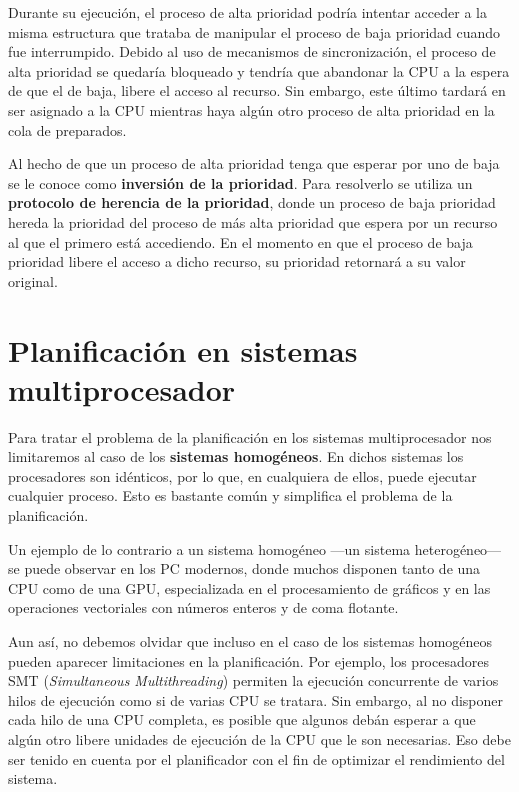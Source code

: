 Durante su ejecución, el proceso de alta prioridad podría intentar
acceder a la misma estructura que trataba de manipular el proceso de
baja prioridad cuando fue interrumpido. Debido al uso de mecanismos de
sincronización, el proceso de alta prioridad se quedaría bloqueado y
tendría que abandonar la CPU a la espera de que el de baja, libere el
acceso al recurso. Sin embargo, este último tardará en ser asignado a la
CPU mientras haya algún otro proceso de alta prioridad en la cola de
preparados.

Al hecho de que un proceso de alta prioridad tenga que esperar por uno
de baja se le conoce como \textbf{{}inversión de la prioridad}. Para
resolverlo se utiliza un \textbf{{}protocolo de herencia de la
prioridad}, donde un proceso de baja prioridad hereda la prioridad del
proceso de más alta prioridad que espera por un recurso al que el
primero está accediendo. En el momento en que el proceso de baja
prioridad libere el acceso a dicho recurso, su prioridad retornará a su
valor original.

\section{Planificación en sistemas
multiprocesador}\label{_planificaciuxf3n_en_sistemas_multiprocesador}

Para tratar el problema de la planificación en los sistemas
multiprocesador nos limitaremos al caso de los \textbf{sistemas
homogéneos}{}. En dichos sistemas los procesadores son idénticos, por lo
que, en cualquiera de ellos, puede ejecutar cualquier proceso. Esto es
bastante común y simplifica el problema de la planificación.

Un ejemplo de lo contrario a un sistema homogéneo ---un sistema
heterogéneo--- se puede observar en los PC modernos, donde muchos
disponen tanto de una CPU como de una GPU, especializada en el
procesamiento de gráficos y en las operaciones vectoriales con números
enteros y de coma flotante.

Aun así, no debemos olvidar que incluso en el caso de los sistemas
homogéneos pueden aparecer limitaciones en la planificación. Por
ejemplo, los procesadores SMT (\emph{Simultaneous Multithreading})
permiten la ejecución concurrente de varios hilos de ejecución como si
de varias CPU se tratara. Sin embargo, al no disponer cada hilo de una
CPU completa, es posible que algunos debán esperar a que algún otro
libere unidades de ejecución de la CPU que le son necesarias. Eso debe
ser tenido en cuenta por el planificador con el fin de optimizar el
rendimiento del sistema.

